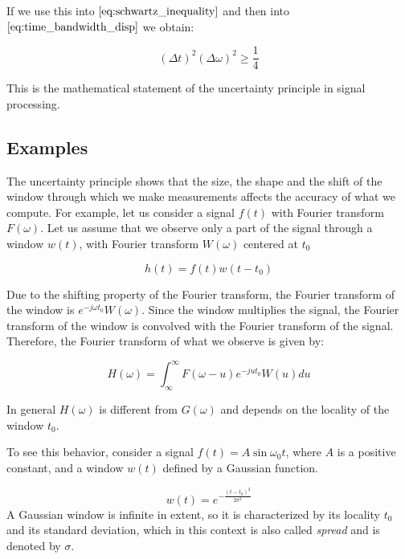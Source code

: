 If we use this into $\eqref{eq:schwartz_inequality}$ and then into $\eqref{eq:time_bandwidth_disp}$ we obtain:

\begin{equation}\label{eq:}
   (\Delta t)^2(\Delta \omega)^2 \geq \frac{1}{4} 
\end{equation}

This is the mathematical statement of the uncertainty principle in signal processing.

\subsection{Examples}

The uncertainty principle shows that the size, the shape and the shift of the window through which we make measurements affects the accuracy of what we compute. For example, let us consider a signal $f(t)$ with Fourier transform $F(\omega)$. Let us assume that we observe only a part of the signal through a window $w(t)$, with Fourier transform $W(\omega)$ centered at $t_0$

\begin{equation}\label{eq:uncertainty_principle2}
    h(t) = f(t)w(t-t_0)
\end{equation}


Due to the shifting property of the Fourier transform, the Fourier transform of the window is $e^{-j\omega t_0}W(\omega)$. Since the window multiplies the signal, the Fourier transform of the window is convolved with the Fourier transform of the signal. Therefore, the Fourier transform of what we observe is given by:

\begin{equation}\label{eq:short_time_fourier_transform}
    H(\omega) = \int_{\infty}^{\infty}F(\omega - u)e^{-ju t_0}W(u) du
\end{equation}


In general $H(\omega)$ is different from $G(\omega)$ and depends on the locality of the window $t_0$.

To see this behavior, consider a signal $f(t)=A \sin \omega_{0} t$, where $A$ is a positive constant, and a window $w(t)$ defined by a Gaussian function. 

\begin{equation}\label{eq:1d_gaussian_function}
    w(t)=e^{-\frac{(t-t_0)^2}{2\sigma^2}}
\end{equation}
A Gaussian window is infinite in extent, so it is characterized by its locality $t_0$ and its standard deviation, which in this context is also called \textit{spread} and is denoted by $\sigma$. 

